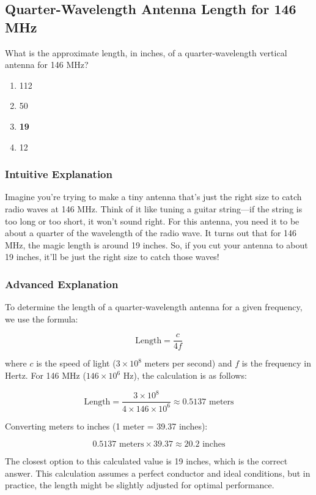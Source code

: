 \subsection{Quarter-Wavelength Antenna Length for 146 MHz}
\label{T9A08}

\begin{tcolorbox}[colback=gray!10!white,colframe=black!75!black,title=T9A08]
What is the approximate length, in inches, of a quarter-wavelength vertical antenna for 146 MHz?
\begin{enumerate}[label=\Alph*)]
    \item 112
    \item 50
    \item \textbf{19}
    \item 12
\end{enumerate}
\end{tcolorbox}

\subsubsection{Intuitive Explanation}
Imagine you’re trying to make a tiny antenna that’s just the right size to catch radio waves at 146 MHz. Think of it like tuning a guitar string—if the string is too long or too short, it won’t sound right. For this antenna, you need it to be about a quarter of the wavelength of the radio wave. It turns out that for 146 MHz, the magic length is around 19 inches. So, if you cut your antenna to about 19 inches, it’ll be just the right size to catch those waves!

\subsubsection{Advanced Explanation}
To determine the length of a quarter-wavelength antenna for a given frequency, we use the formula:

\[
\text{Length} = \frac{c}{4f}
\]

where \( c \) is the speed of light (\( 3 \times 10^8 \) meters per second) and \( f \) is the frequency in Hertz. For 146 MHz (\( 146 \times 10^6 \) Hz), the calculation is as follows:

\[
\text{Length} = \frac{3 \times 10^8}{4 \times 146 \times 10^6} \approx 0.5137 \text{ meters}
\]

Converting meters to inches (1 meter = 39.37 inches):

\[
0.5137 \text{ meters} \times 39.37 \approx 20.2 \text{ inches}
\]

The closest option to this calculated value is 19 inches, which is the correct answer. This calculation assumes a perfect conductor and ideal conditions, but in practice, the length might be slightly adjusted for optimal performance.

